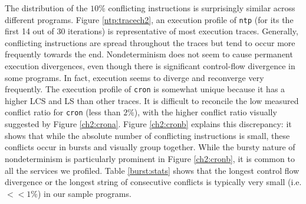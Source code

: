 The distribution of the $10\%$ conflicting instructions
is surprisingly similar across different programs.
Figure \ref{ntp:tracech2}, an execution profile of \texttt{ntp}
(for its the first 14 out of 30 iterations) is representative
of most execution traces. Generally,
conflicting instructions are spread throughout
the traces but tend to occur more frequently
towards the end. Nondeterminism does not seem to cause permanent 
execution divergences, even though there is significant
control-flow divergence in some programs. In fact, execution seems to
diverge and reconverge very frequently.
The execution profile of \texttt{cron} is somewhat unique
because it has a higher LCS and LS than other traces. It is
difficult to reconcile the low measured conflict ratio for \texttt{cron} (less
than $2\%$), with the higher conflict ratio visually suggested by 
Figure \ref{ch2:crona}. Figure \ref{ch2:cronb} 
explains this discrepancy: it shows that while
the absolute number of conflicting instructions is small,
these conflicts occur in bursts and visually group together. 
While the bursty nature of nondeterminism
is particularly prominent in Figure \ref{ch2:cronb},
it is common to all the services we profiled. Table \ref{burst:stats}
shows that the longest control flow divergence 
or the longest string of consecutive conflicts
is typically very small (i.e. $<<1\%$) 
in our sample programs.

